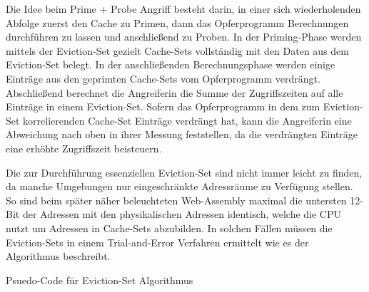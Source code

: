 Die Idee beim Prime + Probe Angriff besteht darin, in einer sich wiederholenden Abfolge zuerst den Cache zu Primen, dann das Opferprogramm Berechnungen durchführen zu lassen und anschließend zu Proben. In der Priming-Phase werden mittels der Eviction-Set gezielt Cache-Sets vollständig mit den Daten aus dem Eviction-Set belegt. In der anschließenden Berechnungsphase werden einige Einträge aus den geprimten Cache-Sets vom Opferprogramm verdrängt. Abschließend berechnet die Angreiferin die Summe der Zugriffszeiten auf alle Einträge in einem Eviction-Set. Sofern das Opferprogramm in dem zum Eviction-Set korrelierenden Cache-Set Einträge verdrängt hat, kann die Angreiferin eine Abweichung nach oben in ihrer Messung feststellen, da die verdrängten Einträge eine erhöhte Zugriffszeit beisteuern.

Die zur Durchführung essenziellen Eviction-Set sind nicht immer leicht zu finden, da manche Umgebungen nur eingeschränkte Adressräume zu Verfügung stellen. So sind beim später näher beleuchteten Web-Assembly maximal die untersten 12-Bit der Adressen mit den physikalischen Adressen identisch, welche die CPU nutzt um Adressen in Cache-Sets abzubilden.
In solchen Fällen müssen die Eviction-Sets in einem Trial-and-Error Verfahren ermittelt wie es der Algorithmus %
beschreibt.



\begin{algorithm}[h]
\DontPrintSemicolon
\caption{Psuedo-Code für Eviction-Set Algorithmus}
\label{alg:evictionSet}





\end{algorithm}